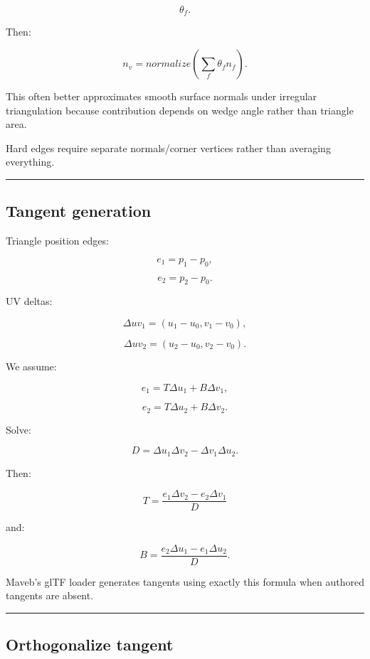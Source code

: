 \[
\theta_f.
\]

Then:

\[
\boxed{
n_v=
normalize
\left(
\sum_f
\theta_fn_f
\right).
}
\]

This often better approximates smooth surface normals under irregular triangulation because contribution depends on wedge angle rather than triangle area.

Hard edges require separate normals/corner vertices rather than averaging everything.

\begin{center}\rule{0.5\linewidth}{0.5pt}\end{center}

\subsection{Tangent generation}\label{04-visual-computing-ii-ch041-tangent-generation}

Triangle position edges:

\[
e_1=p_1-p_0,
\]

\[
e_2=p_2-p_0.
\]

UV deltas:

\[
\Delta uv_1=
(u_1-u_0,v_1-v_0),
\]

\[
\Delta uv_2=
(u_2-u_0,v_2-v_0).
\]

We assume:

\[
e_1=
T\Delta u_1+
B\Delta v_1,
\]

\[
e_2=
T\Delta u_2+
B\Delta v_2.
\]

Solve:

\[
D=
\Delta u_1\Delta v_2
-
\Delta v_1\Delta u_2.
\]

Then:

\[
\boxed{
T=
\frac{
e_1\Delta v_2-
e_2\Delta v_1
}{D}
}
\]

and:

\[
\boxed{
B=
\frac{
e_2\Delta u_1-
e_1\Delta u_2
}{D}.
}
\]

Maveb's glTF loader generates tangents using exactly this formula when authored tangents are absent.

\begin{center}\rule{0.5\linewidth}{0.5pt}\end{center}

\subsection{Orthogonalize tangent}\label{04-visual-computing-ii-ch041-orthogonalize-tangent}

